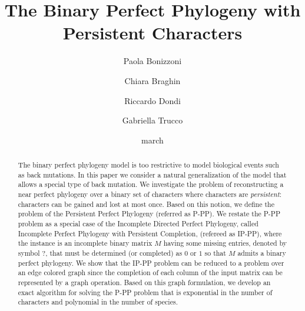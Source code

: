 \documentclass{llncs}
\begin{document}
\title{The Binary Perfect Phylogeny with Persistent Characters}
\author{Paola Bonizzoni \and Chiara Braghin  \and Riccardo Dondi \and Gabriella Trucco 
}


\pagestyle{plain}
\date{march}\maketitle



\begin{abstract}
The  binary perfect phylogeny model is too restrictive to model  biological events such as back mutations. In this paper we consider a  natural generalization of the  model that allows a special type of back mutation.  We investigate the  problem of reconstructing  a  near perfect phylogeny over a binary set of characters where   characters are {\em persistent}:
 characters  can be  gained and lost at most once. Based on this notion, we define the problem of  the Persistent Perfect Phylogeny (referred as P-PP). 
We restate the P-PP problem  as a special case of the Incomplete Directed Perfect Phylogeny,  called Incomplete  Perfect Phylogeny with Persistent Completion, (refereed as IP-PP),  where the instance is an incomplete binary matrix  $M$ having some missing entries, denoted by symbol $?$, that must be determined (or completed) as $0$ or $1$ so that  $M$ admits a binary perfect phylogeny.
We show that the IP-PP problem can be reduced to a problem over an edge colored graph since the  completion of  each column of the input  matrix  can be  represented by a graph operation. 
  Based on this graph formulation,  we develop  an exact algorithm  for solving  the P-PP problem that is exponential in the number of characters and polynomial in the number of species. 
\end{abstract}
\end{document}
